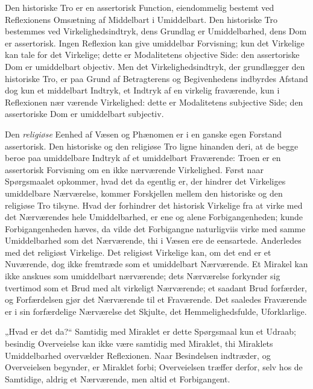 \documentclass[12pt]{book}
\newcommand{\opage}[1]{\marginnote{\footnotesize\textit{[#1]}}}
\begin{document}
Den historiske Tro er en assertorisk Function, eiendommelig
bestemt ved Reflexionens Omsætning af Middelbart i
Umiddelbart. Den historiske Tro bestemmes ved Virkelighedsindtryk,
dens Grundlag er Umiddelbarhed, dens Dom er
assertorisk. Ingen Reflexion kan give umiddelbar Forvisning;
kun det Virkelige kan tale for det Virkelige; dette er Modalitetens
objective Side: den assertoriske Dom er umiddelbart
objectiv. Men det Virkelighedsindtryk, der grundlægger den
historiske Tro, er paa Grund af Betragterens og Begivenhedens
indbyrdes Afstand dog kun et middelbart Indtryk, et
Indtryk af en virkelig fraværende, kun i Reflexionen nær%
\opage{208}værende Virkelighed: dette er Modalitetens subjective Side;
den assertoriske Dom er umiddelbart subjectiv.

Den \emph{religiøse} Eenhed af Væsen og Phænomen er i en
ganske egen Forstand assertorisk. Den historiske og den religiøse
Tro ligne hinanden deri, at de begge beroe paa umiddelbare
Indtryk af et umiddelbart Fraværende: Troen er en
assertorisk Forvisning om en ikke nærværende Virkelighed.
Først naar Spørgsmaalet opkommer, hvad det da egentlig er,
der hindrer det Virkeliges umiddelbare Nærværelse, kommer
Forskjellen mellem den historiske og den religiøse Tro tilsyne.
Hvad der forhindrer det historisk Virkelige fra at virke med
det Nærværendes hele Umiddelbarhed, er ene og alene Forbigangenheden;
kunde Forbigangenheden hæves, da vilde det
Forbigangne naturligviis virke med samme Umiddelbarhed
som det Nærværende, thi i Væsen ere de eensartede. Anderledes
med det religiøst Virkelige. Det religiøst Virkelige kan,
om det end er et Nuværende, dog ikke fremtræde som et
umiddelbart Nærværende. Et Mirakel kan ikke anskues som
umiddelbart nærværende; dets Nærværelse forkynder sig tvertimod
som et Brud med alt virkeligt Nærværende; et saadant
Brud forfærder, og Forfærdelsen gjør det Nærværende til et
Fraværende. Det saaledes Fraværende er i sin forfærdelige
Nærværelse det Skjulte, det Hemmelighedsfulde, Uforklarlige.

„Hvad er det da?“ Samtidig med Miraklet er dette
Spørgsmaal kun et Udraab; besindig Overveielse kan ikke
være samtidig med Miraklet, thi Miraklets Umiddelbarhed
overvælder Reflexionen. Naar Besindelsen indtræder, og
Overveielsen begynder, er Miraklet forbi; Overveielsen træffer
derfor, selv hos de Samtidige, aldrig et Nærværende, men
altid et Forbigangent.
\end{document}
